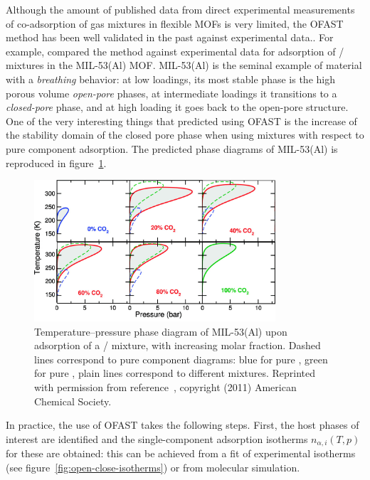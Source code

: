 \documentclass[thesis]{subfiles}
\begin{document}
Although the amount of published data from direct experimental measurements of
co-adsorption of gas mixtures in flexible MOFs is very limited, the OFAST method
has been well validated in the past against experimental data.\cite{Ortiz2011,
Hoffmann2011, Zang2011}. For example, \citeauthor{Ortiz2011}\cite{Ortiz2011}
compared the method against experimental data for adsorption of
/ mixtures in the MIL-53(Al) MOF. MIL-53(Al) is the seminal
example of material with a \emph{breathing} behavior: at low loadings, its most
stable phase is the high porous volume \emph{open-pore} phases, at intermediate
loadings it transitions to a \emph{closed-pore} phase, and at high loading it
goes back to the open-pore structure. One of the very interesting things that
\citeauthor{Ortiz2011} predicted using OFAST is the increase of the stability
domain of the closed pore phase when using mixtures with respect to pure
component adsorption. The predicted phase diagrams of MIL-53(Al) is reproduced
in figure~\ref{fig:ofast:ortiz}.

\begin{figure}[ht]
    \centering
    \includegraphics[width=0.8\textwidth]{figures/cited/ofast-phase-diagram-rotated}
    \caption{Temperature–pressure phase diagram of MIL-53(Al) upon adsorption
    of a / mixture, with increasing  molar fraction.
    Dashed lines correspond to pure component diagrams: blue for pure ,
    green for pure , plain lines correspond to different mixtures.
    Reprinted with permission from reference~\cite{Ortiz2011}, copyright (2011)
    American Chemical Society.}
    \label{fig:ofast:ortiz}
\end{figure}

In practice, the use of OFAST takes the following steps. First, the host
phases of interest are identified and the single-component adsorption isotherms
$n_{\alpha,i}(T, p)$ for these are obtained: this can be achieved from a fit of
experimental isotherms (see figure~\ref{fig:open-close-isotherms}) or from
molecular simulation.
\end{document}
